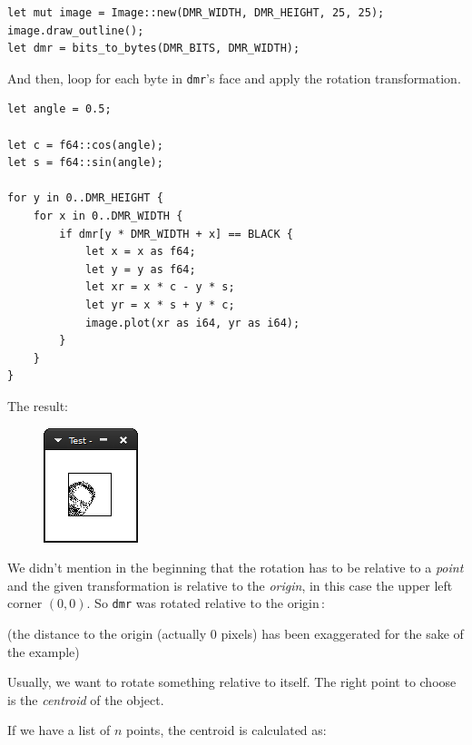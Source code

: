 \documentclass[12pt,openany,a4,usenames,dvipsnames]{book}
\newcommand\pixels{{\pixelfont{}pixels}}
\begin{document}
\begin{verbatim}
let mut image = Image::new(DMR_WIDTH, DMR_HEIGHT, 25, 25);
image.draw_outline();
let dmr = bits_to_bytes(DMR_BITS, DMR_WIDTH);
\end{verbatim}

And then, loop for each byte in \texttt{dmr}'s face and apply the rotation transformation.

\begin{verbatim}
let angle = 0.5;

let c = f64::cos(angle);
let s = f64::sin(angle);

for y in 0..DMR_HEIGHT {
    for x in 0..DMR_WIDTH {
        if dmr[y * DMR_WIDTH + x] == BLACK {
            let x = x as f64;
            let y = y as f64;
            let xr = x * c - y * s;
            let yr = x * s + y * c;
            image.plot(xr as i64, yr as i64);
        }
    }
}
\end{verbatim}

The result:

\begin{figure}[H]
\centering
\includegraphics{figures/ch11-2.png}
\end{figure}

We didn't mention in the beginning that the rotation has to be relative to a \emph{point} and the given transformation is relative to the \emph{origin}, in this case the upper left corner $(0,0)$. So \texttt{dmr} was rotated relative to the origin\,:
\begin{figure}[H]
\centering
  \def\svgscale{0.6}

  \def\svgscale{0.6}

\end{figure}

{\centering{}
\noindent(the distance to the origin (actually 0 \pixels{}) has been exaggerated for the sake of the example)
}

Usually, we want to rotate something relative to itself. The right point to choose is the \emph{centroid} of the object.

If we have a list of $n$ points, the centroid is calculated as:
\end{document}
